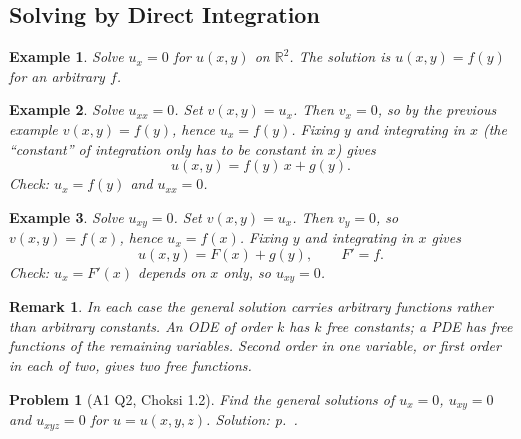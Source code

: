 \documentclass{article}
\newtheorem{problem}{Problem}
\newtheorem*{example}{Example}
\newtheorem{remark}{Remark}
\begin{document}
\subsection{Solving by Direct Integration}
\begin{example}
    Solve $u_x = 0$ for $u(x,y)$ on $\mathbb{R}^2$. The solution is $u(x,y) = f(y)$ for an arbitrary $f$.
\end{example}
\begin{example}
    Solve $u_{xx} = 0$. Set $v(x,y) = u_x$. Then $v_x = 0$, so by the previous example $v(x,y) = f(y)$, hence $u_x = f(y)$. Fixing $y$ and integrating in $x$ (the ``constant'' of integration only has to be constant in $x$) gives
    \begin{equation}
        u(x,y) = f(y)\,x + g(y).
    \end{equation}
    Check: $u_x = f(y)$ and $u_{xx} = 0$.
\end{example}
\begin{example}
    Solve $u_{xy} = 0$. Set $v(x,y) = u_x$. Then $v_y = 0$, so $v(x,y) = f(x)$, hence $u_x = f(x)$. Fixing $y$ and integrating in $x$ gives
    \begin{equation}
        u(x,y) = F(x) + g(y), \qquad F' = f.
    \end{equation}
    Check: $u_x = F'(x)$ depends on $x$ only, so $u_{xy} = 0$.
\end{example}
\begin{remark}
    In each case the general solution carries arbitrary \emph{functions} rather than arbitrary constants. An ODE of order $k$ has $k$ free constants; a PDE has free functions of the remaining variables. Second order in one variable, or first order in each of two, gives two free functions.
\end{remark}

\begin{problem}[A1 Q2, Choksi 1.2]\label{prob:a1-12}
    Find the general solutions of $u_x = 0$, $u_{xy} = 0$ and $u_{xyz} = 0$ for $u = u(x,y,z)$.
    \hfill \emph{Solution: p.~\pageref{sol:a1-12}.}
\end{problem}
\end{document}
